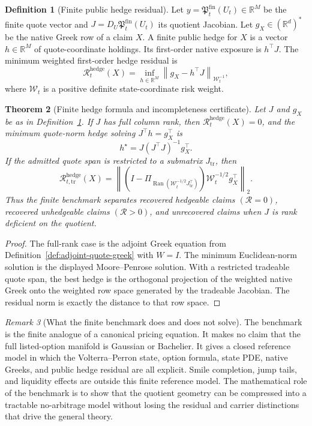 \documentclass[11pt,a4paper]{amsart}
\theoremstyle{plain}
\newtheorem{theorem}{Theorem}[section]
\theoremstyle{definition}
\newtheorem{definition}[theorem]{Definition}
\theoremstyle{remark}
\newtheorem{remark}[theorem]{Remark}
\DeclareMathOperator{\Ran}{Ran}
\newcommand{\R}{\mathbb{R}}
\newcommand{\norm}[1]{\left\lVert #1\right\rVert}
\begin{document}
\begin{definition}[Finite public hedge residual]\label{def:finite-public-hedge-residual}
Let \(y=\mathfrak P_t^{\mathrm{fin}}(U_t)\in\R^M\) be the finite quote vector and
\(J=D_U\mathfrak P_t^{\mathrm{fin}}(U_t)\) its quotient Jacobian.  Let \(g_X\in(\R^d)^*\) be the
native Greek row of a claim \(X\).  A finite public hedge for \(X\) is a vector
\(h\in\R^M\) of quote-coordinate holdings.  Its first-order native exposure is \(h^\top J\).  The
minimum weighted first-order hedge residual is
\[
        \mathcal R_t^{\mathrm{hedge}}(X)
        =
        \inf_{h\in\R^M}
        \norm{g_X-h^\top J}_{\mathcal W_t^{-1}},
\]
where \(\mathcal W_t\) is a positive definite state-coordinate risk weight.
\end{definition}

\begin{theorem}[Finite hedge formula and incompleteness certificate]\label{thm:finite-hedge-formula}
Let \(J\) and \(g_X\) be as in Definition~\ref{def:finite-public-hedge-residual}.  If \(J\) has
full column rank, then \(\mathcal R_t^{\mathrm{hedge}}(X)=0\), and the minimum quote-norm hedge
solving \(J^\top h=g_X^\top\) is
\[
        h^\star
        =
        J(J^\top J)^{-1}g_X^\top .
\]
If the admitted quote span is restricted to a submatrix \(J_{\mathrm{tr}}\), then
\[
        \mathcal R_{t,\mathrm{tr}}^{\mathrm{hedge}}(X)
        =
        \norm{
        (I-\Pi_{\Ran(\mathcal W_t^{-1/2}J_{\mathrm{tr}}^\top)})
        \mathcal W_t^{-1/2}g_X^\top
        }_2 .
\]
Thus the finite benchmark separates recovered hedgeable claims \((\mathcal R=0)\), recovered
unhedgeable claims \((\mathcal R>0)\), and unrecovered claims
when \(J\) is rank deficient on the quotient.
\end{theorem}

\begin{proof}
The full-rank case is the adjoint Greek equation from
Definition~\ref{def:adjoint-quote-greek} with \(W=I\).  The minimum Euclidean-norm solution is
the displayed Moore--Penrose solution.  With a restricted tradeable quote span, the best hedge is the
orthogonal projection of the weighted native Greek onto the weighted row space generated by the
tradeable Jacobian.  The residual norm is exactly the distance to that row space.
\end{proof}

\begin{remark}[What the finite benchmark does and does not solve]\label{rem:finite-benchmark-scope}
The benchmark is the finite analogue of a canonical pricing equation.  It makes no claim that the
full listed-option manifold is Gaussian or Bachelier.  It gives a closed reference model in which the
Volterra--Perron state, option formula, state PDE, native Greeks, and public hedge residual are
all explicit.  Smile completion, jump tails, and liquidity effects are outside this finite
reference model.  The mathematical role of the benchmark is to show that the quotient
geometry can be compressed into a tractable no-arbitrage model without losing the residual and
carrier distinctions that drive the general theory.
\end{remark}
\end{document}
